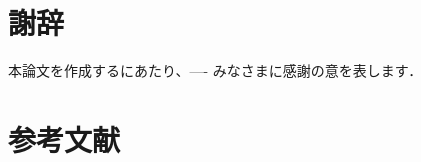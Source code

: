 \documentclass[11pt,a4j]{jreport}
\begin{document}
\chapter*{謝辞} %
本論文を作成するにあたり、---- みなさまに感謝の意を表します．

\chapter*{参考文献}
\renewcommand{\bibname}{参考文献} %
\end{document}
